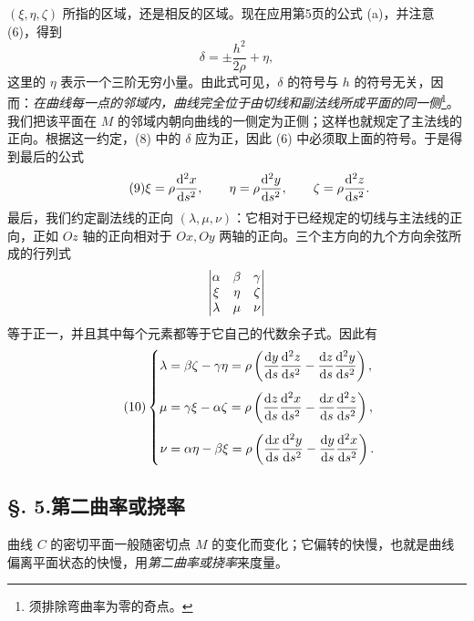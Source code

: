 \noindent \((\xi,\eta,\zeta)\) 所指的区域，还是相反的区域。现在应用第5页的公式 (a)，并注意 (6)，得到
\begin{equation}\tag{8}
\delta=\pm\frac{h^2}{2\rho}+\eta,
\end{equation}
这里的 \(\eta\) 表示一个三阶无穷小量。由此式可见，\(\delta\) 的符号与 \(h\) 的符号无关，因而：\emph{在曲线每一点的邻域内，曲线完全位于由切线和副法线所成平面的同一侧}\footnote{须排除弯曲率为零的奇点。}。我们把该平面在 \(M\) 的邻域内朝向曲线的一侧定为正侧；这样也就规定了主法线的正向。根据这一约定，(8) 中的 \(\delta\) 应为正，因此 (6) 中必须取上面的符号。于是得到最后的公式
\begin{equation}\tag{9}
\xi=\rho\frac{\mathrm{d}^2x}{\mathrm{d} s^2},\qquad
\eta=\rho\frac{\mathrm{d}^2y}{\mathrm{d} s^2},\qquad
\zeta=\rho\frac{\mathrm{d}^2z}{\mathrm{d} s^2}.
\end{equation}
最后，我们约定副法线的正向 \((\lambda,\mu,\nu)\)：它相对于已经规定的切线与主法线的正向，正如 \(Oz\) 轴的正向相对于 \(Ox,Oy\) 两轴的正向。三个主方向的九个方向余弦所成的行列式
\[
\left|\begin{matrix}\alpha & \beta & \gamma\\
\xi & \eta & \zeta\\
\lambda & \mu & \nu\end{matrix}\right|
\]
等于正一，并且其中每个元素都等于它自己的代数余子式。因此有
\begin{equation}\tag{10}
\left\{
\begin{aligned}
\lambda&=\beta\zeta-\gamma\eta=\rho\left(\frac{\mathrm{d} y}{\mathrm{d} s}\frac{\mathrm{d}^2z}{\mathrm{d} s^2}-\frac{\mathrm{d} z}{\mathrm{d} s}\frac{\mathrm{d}^2y}{\mathrm{d} s^2}\right),\\[0.4em]
\mu&=\gamma\xi-\alpha\zeta=\rho\left(\frac{\mathrm{d} z}{\mathrm{d} s}\frac{\mathrm{d}^2x}{\mathrm{d} s^2}-\frac{\mathrm{d} x}{\mathrm{d} s}\frac{\mathrm{d}^2z}{\mathrm{d} s^2}\right),\\[0.4em]
\nu&=\alpha\eta-\beta\xi=\rho\left(\frac{\mathrm{d} x}{\mathrm{d} s}\frac{\mathrm{d}^2y}{\mathrm{d} s^2}-\frac{\mathrm{d} y}{\mathrm{d} s}\frac{\mathrm{d}^2x}{\mathrm{d} s^2}\right).
\end{aligned}\right.
\end{equation}

\subsection*{§. 5.\quad 第二曲率或挠率}
曲线 \(C\) 的密切平面一般随密切点 \(M\) 的变化而变化；它偏转的快慢，也就是曲线偏离平面状态的快慢，用\emph{第二曲率或挠率}来度量。


